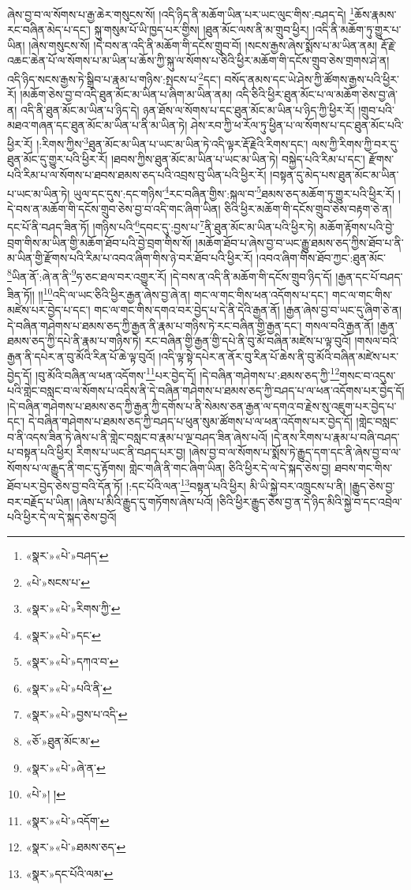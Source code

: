 ཞེས་བྱ་བ་ལ་སོགས་པ་རྒྱ་ཆེར་གསུངས་སོ། །འདི་ཉིད་ནི་མཆོག་ཡིན་པར་ཡང་ལུང་གིས་:བཤད་དེ། \footnote{«སྣར་»«པེ་»བཤད་}ཆོས་རྣམས་རང་བཞིན་མེད་པ་དང་། སྐུ་གསུམ་པོ་ཡི་ཁྱད་པར་གྱིས། །ཐུན་མོང་ལས་ནི་མ་གྲུབ་ཕྱིར། །འདི་ནི་མཆོག་ཏུ་གྱུར་པ་ཡིན། །ཞེས་གསུངས་སོ། །དེ་བས་ན་འདི་ནི་མཆོག་གི་དངོས་གྲུབ་བོ། །སངས་རྒྱས་ཞེས་སྨོས་པ་མ་ཡིན་ནམ། རྡོ་རྗེ་འཆང་ཆེན་པོ་ལ་སོགས་པ་མ་ཡིན་པ་ཆོས་ཀྱི་སྐུ་ལ་སོགས་པ་ཅིའི་ཕྱིར་མཆོག་གི་དངོས་གྲུབ་ཅེས་གྲགས་ཤེ་ན། འདི་ཉིད་སངས་རྒྱས་ཏེ་སྒྲིབ་པ་རྣམ་པ་གཉིས་:སྤངས་པ་\footnote{«པེ་»སངས་པ་}དང་། བསོད་ནམས་དང་ཡེ་ཤེས་ཀྱི་ཚོགས་རྒྱས་པའི་ཕྱིར་རོ། །མཆོག་ཅེས་བྱ་བ་འདི་ཐུན་མོང་མ་ཡིན་པ་ཞིག་མ་ཡིན་ནམ། འདི་ཅིའི་ཕྱིར་ཐུན་མོང་པ་ལ་མཆོག་ཅེས་བྱ་ཞེ་ན། འདི་ནི་ཐུན་མོང་མ་ཡིན་པ་ཉིད་དེ། ཉན་ཐོས་ལ་སོགས་པ་དང་ཐུན་མོང་མ་ཡིན་པ་ཉིད་ཀྱི་ཕྱིར་རོ། །གྲུབ་པའི་མཐའ་གཞན་དང་ཐུན་མོང་མ་ཡིན་པ་ནི་མ་ཡིན་ཏེ། ཤེས་རབ་ཀྱི་ཕ་རོལ་ཏུ་ཕྱིན་པ་ལ་སོགས་པ་དང་ཐུན་མོང་པའི་ཕྱིར་རོ། །:རིགས་ཀྱིས་\footnote{«སྣར་»«པེ་»རིགས་ཀྱི་}ཐུན་མོང་མ་ཡིན་པ་ཡང་མ་ཡིན་ཏེ་འདི་ལྟར་རྡོ་རྗེའི་རིགས་དང་། ལས་ཀྱི་རིགས་ཀྱི་བར་དུ་ཐུན་མོང་དུ་གྱུར་པའི་ཕྱིར་རོ། །ཐབས་ཀྱིས་ཐུན་མོང་མ་ཡིན་པ་ཡང་མ་ཡིན་ཏེ། བསྐྱེད་པའི་རིམ་པ་དང་། རྫོགས་པའི་རིམ་པ་ལ་སོགས་པ་ཐབས་ཐམས་ཅད་པའི་འབྲས་བུ་ཡིན་པའི་ཕྱིར་རོ། །བསྟན་དུ་མེད་པས་ཐུན་མོང་མ་ཡིན་པ་ཡང་མ་ཡིན་ཏེ། ཡུལ་དང་དུས་:དང་གཉིས་\footnote{«སྣར་»«པེ་»དང་}རང་བཞིན་གྱིས་:སྐལ་བ་\footnote{«སྣར་»«པེ་»དཀའ་བ་}ཐམས་ཅད་མཆོག་ཏུ་གྱུར་པའི་ཕྱིར་རོ། །དེ་བས་ན་མཆོག་གི་དངོས་གྲུབ་ཅེས་བྱ་བ་འདི་གང་ཞིག་ཡིན། ཅིའི་ཕྱིར་མཆོག་གི་དངོས་གྲུབ་ཅེས་བརྟག་ཅེ་ན། དང་པོ་ནི་བཤད་ཟིན་ཏོ། །གཉིས་པའི་\footnote{«སྣར་»«པེ་»པའི་ནི་}དབང་དུ་:བྱས་པ་\footnote{«སྣར་»«པེ་»བྱས་པ་འདི་}ནི་ཐུན་མོང་མ་ཡིན་པའི་ཕྱིར་ཏེ། མཆོག་རྟོགས་པའི་བྱེ་བྲག་གིས་མ་ཡིན་གྱི་མཆོག་ཐོབ་པའི་བྱེ་བྲག་གིས་སོ། །མཆོག་ཐོབ་པ་ཞེས་བྱ་བ་ཡང་རྒྱུ་ཐམས་ཅད་ཀྱིས་ཐོབ་པ་ནི་མ་ཡིན་གྱི་རྫོགས་པའི་རིམ་པ་འབའ་ཞིག་གིས་ཉེ་བར་ཐོབ་པའི་ཕྱིར་རོ། །འབའ་ཞིག་གིས་ཐོབ་ཀྱང་:ཐུན་མོང་\footnote{«ཅོ་»ཐུན་མོང་མ་}ཡིན་ནོ་:ཞེ་ན་ནི་\footnote{«སྣར་»«པེ་»ཞེ་ན་}ཧ་ཅང་ཐལ་བར་འགྱུར་རོ། །དེ་བས་ན་འདི་ནི་མཆོག་གི་དངོས་གྲུབ་ཉིད་དོ། །རྒྱན་དང་པོ་བཤད་ཟིན་ཏོ།། །།\footnote{«པེ་»། །}འདི་ལ་ཡང་ཅིའི་ཕྱིར་རྒྱན་ཞེས་བྱ་ཞེ་ན། གང་ལ་གང་གིས་ཕན་འདོགས་པ་དང་། གང་ལ་གང་གིས་མཛེས་པར་བྱེད་པ་དང་། གང་ལ་གང་གིས་དགའ་བར་བྱེད་པ་དེ་ནི་དེའི་རྒྱན་ནོ། །རྒྱན་ཞེས་བྱ་བ་ཡང་དུ་ཞིག་ཅེ་ན། དེ་བཞིན་གཤེགས་པ་ཐམས་ཅད་ཀྱི་རྒྱན་ནི་རྣམ་པ་གཉིས་ཏེ་རང་བཞིན་གྱི་རྒྱན་དང་། གསལ་བའི་རྒྱན་ནོ། །རྒྱན་ཐམས་ཅད་ཀྱི་དཔེ་ནི་རྣམ་པ་གཉིས་ཏེ། རང་བཞིན་གྱི་རྒྱན་གྱི་དཔེ་ནི་བུ་མོ་བཞིན་མཛེས་པ་ལྟ་བུའོ། །གསལ་བའི་རྒྱན་ནི་དཔེར་ན་བུ་མོའི་རིན་པོ་ཆེ་ལྟ་བུའོ། །འདི་ལྟ་སྟེ་དཔེར་ན་ནོར་བུ་རིན་པོ་ཆེས་ནི་བུ་མོའི་བཞིན་མཛེས་པར་བྱེད་དོ། །བུ་མོའི་བཞིན་ལ་ཕན་འདོགས་\footnote{«སྣར་»«པེ་»འདོག་}པར་བྱེད་དོ། །དེ་བཞིན་གཤེགས་པ་:ཐམས་ཅད་ཀྱི་\footnote{«སྣར་»«པེ་»ཐམས་ཅད་}གསང་བ་འདུས་པའི་གླེང་བསླང་བ་ལ་སོགས་པ་འདིས་ནི་དེ་བཞིན་གཤེགས་པ་ཐམས་ཅད་ཀྱི་བཤད་པ་ལ་ཕན་འདོགས་པར་བྱེད་དོ། །དེ་བཞིན་གཤེགས་པ་ཐམས་ཅད་ཀྱི་རྒྱན་ཀྱི་དགོས་པ་ནི་སེམས་ཅན་རྒྱན་ལ་དགའ་བ་རྗེས་སུ་འཇུག་པར་བྱེད་པ་དང་། དེ་བཞིན་གཤེགས་པ་ཐམས་ཅད་ཀྱི་བཤད་པ་ཕུན་སུམ་ཚོགས་པ་ལ་ཕན་འདོགས་པར་བྱེད་དོ། །གླེང་བསླང་བ་ནི་འདས་ཟིན་ཏེ་ཞེས་པ་ནི་གླེང་བསླང་བ་རྣམ་པ་ལྔ་བཤད་ཟིན་ཞེས་པའོ། །དེ་ནས་རིགས་པ་རྣམ་པ་བཞི་བཤད་པ་བསྟན་པའི་ཕྱིར། རིགས་པ་ཡང་ནི་བཤད་པར་བྱ། །ཞེས་བྱ་བ་ལ་སོགས་པ་སྨོས་ཏེ་རྒྱུད་དག་དང་ནི་ཞེས་བྱ་བ་ལ་སོགས་པ་ལ་རྒྱུད་ནི་གང་དུ་རྟོགས། གླེང་གཞི་ནི་གང་ཞིག་ཡིན། ཅིའི་ཕྱིར་དེ་ལ་དེ་སྐད་ཅེས་བྱ། ཐབས་གང་གིས་ཐོབ་པར་བྱེད་ཅེས་བྱ་བའི་དོན་ཏོ། །:དང་པོའི་ལན་\footnote{«སྣར་»དང་པོའི་ལམ་}བསྟན་པའི་ཕྱིར། མི་ཡི་སྐྱེ་བར་འཁྲུངས་པ་ནི། །རྒྱུད་ཅེས་བྱ་བར་བརྗོད་པ་ཡིན། །ཞེས་པ་མིའི་རྒྱུད་དུ་གཏོགས་ཞེས་པའོ། །ཅིའི་ཕྱིར་རྒྱུད་ཅེས་བྱ་ན་དེ་ཉིད་མིའི་སྐྱེ་བ་དང་འབྲེལ་པའི་ཕྱིར་དེ་ལ་དེ་སྐད་ཅེས་བྱའོ། 
